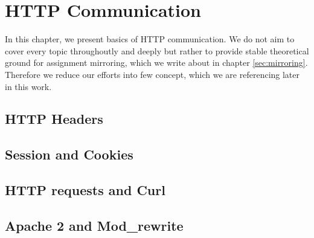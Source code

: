 \chapter{HTTP Communication}

In this chapter, we present basics of HTTP communication. We do not aim to cover every topic throughoutly and deeply but rather to provide stable theoretical ground for assignment mirroring, which we write about in chapter \ref{sec:mirroring}.
Therefore we reduce our efforts into few concept, which we are referencing later in this work.


\section{HTTP Headers}

\section{Session and Cookies}
\label{sec:cookies}

\section{HTTP requests and Curl}

\section{Apache 2 and Mod\_rewrite}